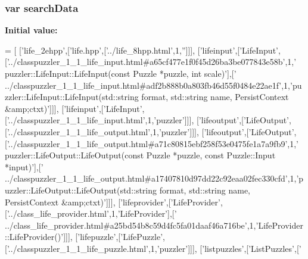 \subsubsection[{search\+Data}]{\setlength{\rightskip}{0pt plus 5cm}var search\+Data}\label{a00054_ad01a7523f103d6242ef9b0451861231e}
{\bfseries Initial value\+:}
\begin{DoxyCode}
=
[
  [\textcolor{stringliteral}{'life\_2ehpp'},[\textcolor{stringliteral}{'life.hpp'},[\textcolor{stringliteral}{'../life\_8hpp.html'},1,\textcolor{stringliteral}{''}]]],
  [\textcolor{stringliteral}{'lifeinput'},[\textcolor{stringliteral}{'LifeInput'},[\textcolor{stringliteral}{'../classpuzzler\_1\_1\_life\_input.html#a65cf477e1f0f45d26ba3be077843e58b'},1,\textcolor{stringliteral}{'
      puzzler::LifeInput::LifeInput(const Puzzle *puzzle, int scale)'}],[\textcolor{stringliteral}{'
      ../classpuzzler\_1\_1\_life\_input.html#adf2b888b0a803fb46d55f0484e22ae1f'},1,\textcolor{stringliteral}{'puzzler::LifeInput::LifeInput(std::string format, std::string name,
       PersistContext &amp;ctxt)'}]]],
  [\textcolor{stringliteral}{'lifeinput'},[\textcolor{stringliteral}{'LifeInput'},[\textcolor{stringliteral}{'../classpuzzler\_1\_1\_life\_input.html'},1,\textcolor{stringliteral}{'puzzler'}]]],
  [\textcolor{stringliteral}{'lifeoutput'},[\textcolor{stringliteral}{'LifeOutput'},[\textcolor{stringliteral}{'../classpuzzler\_1\_1\_life\_output.html'},1,\textcolor{stringliteral}{'puzzler'}]]],
  [\textcolor{stringliteral}{'lifeoutput'},[\textcolor{stringliteral}{'LifeOutput'},[\textcolor{stringliteral}{'../classpuzzler\_1\_1\_life\_output.html#a71c80815ebf258f53e0475fe1a7a9fb9'},1,\textcolor{stringliteral}{'
      puzzler::LifeOutput::LifeOutput(const Puzzle *puzzle, const Puzzle::Input *input)'}],[\textcolor{stringliteral}{'
      ../classpuzzler\_1\_1\_life\_output.html#a17407810d97dd22c92eaa02fec330cfd'},1,\textcolor{stringliteral}{'puzzler::LifeOutput::LifeOutput(std::string format,
       std::string name, PersistContext &amp;ctxt)'}]]],
  [\textcolor{stringliteral}{'lifeprovider'},[\textcolor{stringliteral}{'LifeProvider'},[\textcolor{stringliteral}{'../class\_life\_provider.html'},1,\textcolor{stringliteral}{'LifeProvider'}],[\textcolor{stringliteral}{'
      ../class\_life\_provider.html#a25bd54b8c59d4fc5fa01daaf46a716be'},1,\textcolor{stringliteral}{'LifeProvider::LifeProvider()'}]]],
  [\textcolor{stringliteral}{'lifepuzzle'},[\textcolor{stringliteral}{'LifePuzzle'},[\textcolor{stringliteral}{'../classpuzzler\_1\_1\_life\_puzzle.html'},1,\textcolor{stringliteral}{'puzzler'}]]],
  [\textcolor{stringliteral}{'listpuzzles'},[\textcolor{stringliteral}{'ListPuzzles'},[\textcolor{stringliteral}{'
}
\end{DoxyCode}
